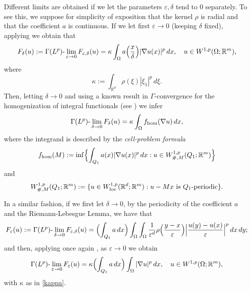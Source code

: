 \documentclass{article}
\theoremstyle{definition}
\newcommand{\e}{\varepsilon}
\newcommand{\R}{\mathbb{R}}
\begin{document}
Different limits are obtained if we let the parameters $\e,\delta$ tend to $0$ separately. To see this, we suppose for simplicity of exposition that the kernel $\rho$ is radial and that the coefficient $a$ is continuous. If we let first $\e\to0$ (keeping $\delta$ fixed), applying \cite[Corollary 8]{P1} we obtain that 
\begin{equation*}
    F_\delta(u):=\Gamma(L^p)\text{-}\lim_{\e\to0} F_{\e,\delta}(u)= \kappa \int_\Omega a\Bigl(\frac{x}{\delta}\Bigr)|\nabla u(x)|^p\, dx, \quad u\in W^{1,p}(\Omega; \R^m),
\end{equation*}
 where
\begin{equation}\label{kappa}
\kappa:=\int_{\R^d}\rho(\xi)|\xi_1|^p\,d\xi.
\end{equation}
Then, letting $\delta\to0$ and using a known result in $\Gamma$-convergence for the homogenization of integral functionals (see \cite[Theorem 14.7]{BDF}) we infer
\begin{equation*}
  \Gamma(L^p)\text{-}\lim_{\delta\to0}  F_\delta(u)= \kappa \int_\Omega f_{\rm hom}(\nabla u)\, dx,
\end{equation*}
where the integrand is described by the {\em cell-problem formula}
\begin{equation*}
    f_{\rm hom}(M):=\inf\Bigl\{\int_{Q_1}a(x)|\nabla u(x)|^p\,dx: u \in W^{1,p}_{\#,M}(Q_1; \R^m) \Bigr\}
\end{equation*}
and
\begin{equation*}
    W^{1,p}_{\#,M}(Q_1; \R^m):=\{u\in W^{1,p}_{\rm loc}(\R^d;\R^m) : u-Mx \text{ is } Q_1\text{-periodic}\}.
\end{equation*}

In a similar fashion, if we first let $\delta\to0$, by the periodicity of the coefficient $a$  and the Riemann-Lebesgue Lemma, we have that
\begin{equation*}
    F_\e(u):=\Gamma(L^p)\text{-}\lim_{\delta\to0} F_{\e,\delta}(u)=  \Bigl(\int_{Q_1}a\,dx\Bigr)\int_\Omega\int_\Omega \frac{1}{\e^d}\rho\Bigl(\frac{y-x}{\e}\Bigr)\Bigl|\frac{u(y)-u(x)}{\e}\Bigr|^p\, dx\,dy;
\end{equation*}
and then, applying once again \cite[Corollary 8]{P1}, as $\e\to0$ we obtain
\begin{equation*}
  \Gamma(L^p)\text{-}\lim_{\e\to0}  F_\e(u)= \kappa \Bigl(\int_{Q_1}a\,dx\Bigr)\int_\Omega |\nabla u|^p\, dx, \quad u\in W^{1,p}(\Omega; \R^m),
\end{equation*}
with $\kappa$ as in \eqref{kappa}.
\end{document}
